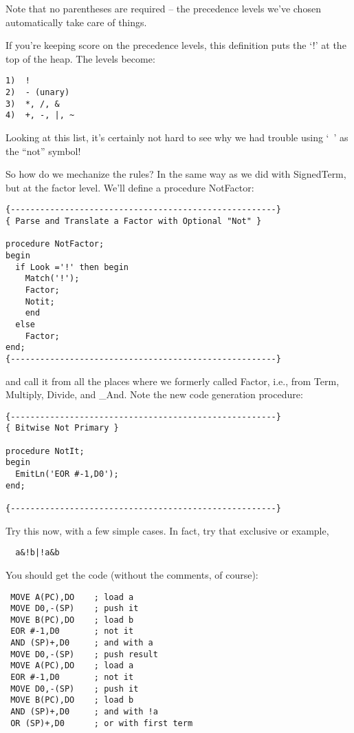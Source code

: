 Note that no parentheses are required -- the precedence levels we've chosen automatically take care of things.

If you're keeping score on the precedence levels, this definition puts the `!' at the top of the heap. The levels become:

\begin{verbatim}
1)	!
2)	- (unary)
3)	*, /, &
4)	+, -, |, ~
\end{verbatim}

Looking at this list, it's certainly not hard to see why we had trouble using `~' as the ``not'' symbol!

So how do we mechanize the rules?  In the same way as we did with SignedTerm, but at the factor level. We'll define a procedure NotFactor:

\begin{verbatim}
{------------------------------------------------------}
{ Parse and Translate a Factor with Optional "Not" }

procedure NotFactor;
begin
  if Look ='!' then begin
    Match('!');
    Factor;
    Notit;
    end
  else
    Factor;
end;
{------------------------------------------------------}
\end{verbatim}

and call it from all the places where we formerly called Factor, i.e., from Term, Multiply, Divide, and _And. Note the new code generation procedure:

\begin{verbatim}
{------------------------------------------------------}
{ Bitwise Not Primary }

procedure NotIt;
begin
  EmitLn('EOR #-1,D0');
end;

{------------------------------------------------------}
\end{verbatim}

Try this now, with a few simple cases. In fact, try that exclusive or example,

\begin{verbatim}
  a&!b|!a&b
\end{verbatim}

You should get the code (without the comments, of course):

\begin{verbatim}
 MOVE A(PC),DO    ; load a
 MOVE D0,-(SP)    ; push it
 MOVE B(PC),DO    ; load b
 EOR #-1,D0       ; not it
 AND (SP)+,D0     ; and with a
 MOVE D0,-(SP)    ; push result
 MOVE A(PC),DO    ; load a
 EOR #-1,D0       ; not it
 MOVE D0,-(SP)    ; push it
 MOVE B(PC),DO    ; load b
 AND (SP)+,D0     ; and with !a
 OR (SP)+,D0      ; or with first term
\end{verbatim}

